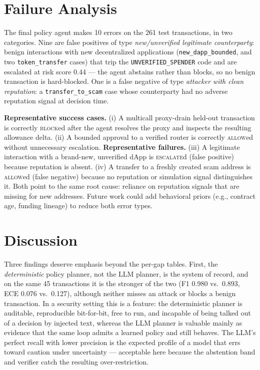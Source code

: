 \documentclass[conference]{IEEEtran}
\begin{document}
\section{Failure Analysis}
The final policy agent makes 10 errors on the 261 test transactions, in two
categories. Nine are false positives of type \emph{new/unverified legitimate
counterparty}: benign interactions with new decentralized applications
(\texttt{new\_dapp\_bounded}, and two \texttt{token\_transfer} cases) that trip the
\texttt{UNVERIFIED\_SPENDER} code and are escalated at risk score 0.44 --- the agent
abstains rather than blocks, so no benign transaction is hard-blocked. One is a false
negative of type \emph{attacker with clean reputation}: a \texttt{transfer\_to\_scam}
case whose counterparty had no adverse reputation signal at decision time.

\textbf{Representative success cases.} (i) A multicall proxy-drain held-out
transaction is correctly \textsc{block}ed after the agent resolves the proxy and
inspects the resulting allowance delta. (ii) A bounded approval to a verified router
is correctly \textsc{allow}ed without unnecessary escalation.
\textbf{Representative failures.} (iii) A legitimate interaction with a brand-new,
unverified dApp is \textsc{escalate}d (false positive) because reputation is absent.
(iv) A transfer to a freshly created scam address is \textsc{allow}ed (false
negative) because no reputation or simulation signal distinguishes it. Both point to
the same root cause: reliance on reputation signals that are missing for new
addresses. Future work could add behavioral priors (e.g., contract age, funding
lineage) to reduce both error types.

\section{Discussion}
Three findings deserve emphasis beyond the per-gap tables. First, the
\emph{deterministic} policy planner, not the LLM planner, is the system of record, and
on the same 45 transactions it is the stronger of the two (F1 0.980 vs.\ 0.893,
ECE 0.076 vs.\ 0.127), although neither misses an attack or blocks a benign
transaction. In a security setting this is a feature: the
deterministic planner is auditable, reproducible bit-for-bit, free to run, and
incapable of being talked out of a decision by injected text, whereas the LLM planner
is valuable mainly as evidence that the same loop admits a learned policy and still
behaves. The LLM's perfect recall with lower precision is the expected profile of a
model that errs toward caution under uncertainty --- acceptable here because the
abstention band and verifier catch the resulting over-restriction.
\end{document}
